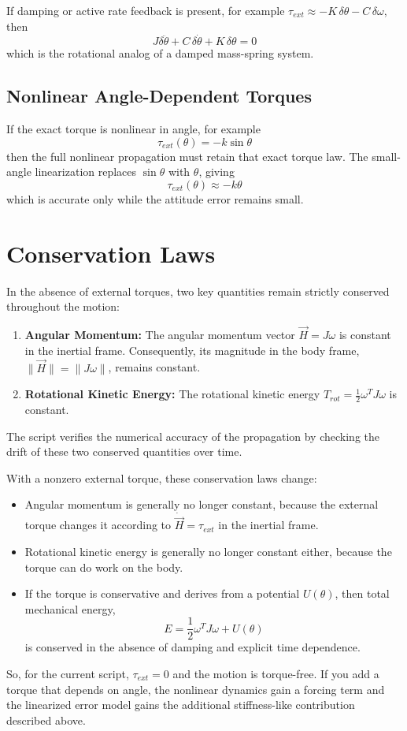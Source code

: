 \documentclass[11pt]{article}
\begin{document}
If damping or active rate feedback is present, for example $\tau_{ext} \approx -K \, \delta\theta - C \, \delta\omega$, then
\begin{equation}
    J \delta\ddot{\theta} + C \, \delta\dot{\theta} + K \, \delta\theta = 0
\end{equation}
which is the rotational analog of a damped mass-spring system.

\subsection{Nonlinear Angle-Dependent Torques}
If the exact torque is nonlinear in angle, for example
\begin{equation}
    \tau_{ext}(\theta) = -k \sin \theta
\end{equation}
then the full nonlinear propagation must retain that exact torque law. The small-angle linearization replaces $\sin \theta$ with $\theta$, giving
\begin{equation}
    \tau_{ext}(\theta) \approx -k\theta
\end{equation}
which is accurate only while the attitude error remains small.

\section{Conservation Laws}
In the absence of external torques, two key quantities remain strictly conserved throughout the motion:
\begin{enumerate}
    \item \textbf{Angular Momentum:} The angular momentum vector $\vec{H} = J\omega$ is constant in the inertial frame. Consequently, its magnitude in the body frame, $\|\vec{H}\| = \|J\omega\|$, remains constant.
    \item \textbf{Rotational Kinetic Energy:} The rotational kinetic energy $T_{rot} = \frac{1}{2} \omega^T J \omega$ is constant.
\end{enumerate}
The script verifies the numerical accuracy of the propagation by checking the drift of these two conserved quantities over time.

With a nonzero external torque, these conservation laws change:
\begin{itemize}
    \item Angular momentum is generally no longer constant, because the external torque changes it according to $\dot{\vec{H}} = \tau_{ext}$ in the inertial frame.
    \item Rotational kinetic energy is generally no longer constant either, because the torque can do work on the body.
    \item If the torque is conservative and derives from a potential $U(\theta)$, then total mechanical energy,
    \begin{equation}
        E = \frac{1}{2} \omega^T J \omega + U(\theta)
    \end{equation}
    is conserved in the absence of damping and explicit time dependence.
\end{itemize}

So, for the current script, $\tau_{ext} = 0$ and the motion is torque-free. If you add a torque that depends on angle, the nonlinear dynamics gain a forcing term and the linearized error model gains the additional stiffness-like contribution described above.
\end{document}
